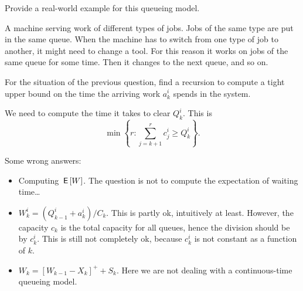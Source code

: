 \begin{exercise}[201704]
  Provide a real-world example for this queueing model.
\begin{solution}
A machine serving work of different types of jobs. Jobs of the same type are put in the same queue. When the machine has to switch from one type of job to another, it might need to change a tool. For this reason it works on jobs of the same queue for some time. Then it changes to the next queue, and so on. 
\end{solution}
\end{exercise}

\begin{exercise}[201704]{2} For the situation of the previous question, find a recursion to compute a tight upper bound on the time the arriving work $a_k^i$ spends in the system.
\begin{solution}
We need to compute the time it takes to clear $Q_k^i$. This is
\begin{equation*}
  \min\left\{r: \sum_{j=k+1}^r c_j^i \geq Q_k^i\right\}.
\end{equation*}

Some wrong answers:
\begin{itemize}
\item Computing $\,\mathsf{E}\left[W\right]$. The question is not to compute the expectation of waiting time\ldots
\item $W_k^i=(Q_{k-1}^i+a_k^i)/C_k$. This is partly ok, intuitively at least. However, the capacity $c_k$ is the total capacity for all queues, hence the division should be by $c_k^i$. This is still not completely ok, because $c_k^i$ is not constant as a function of $k$.
\item $W_k = [W_{k-1}-X_k]^+ + S_k$. Here we are not dealing with a continuous-time queueing model. 
\end{itemize}
\end{solution}
\end{exercise}


